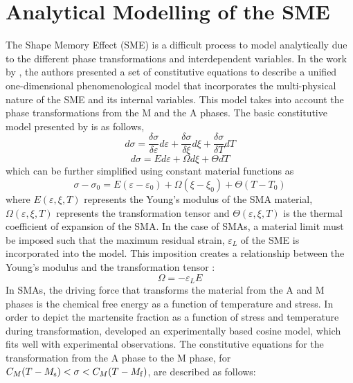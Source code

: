 \section{Analytical Modelling of the SME}

The Shape Memory Effect (SME) is a difficult process to model analytically due to the different phase transformations and interdependent variables. In the work by \cite{liangConstitutiveModelingShape1990a}, the authors presented a set of constitutive equations to describe a unified one-dimensional phenomenological model that incorporates the multi-physical nature of the SME and its internal variables. This model takes into account the phase transformations from the M and the A phases. The basic constitutive model presented by \cite{liangConstitutiveModelingShape1990a} is as follows,
\begin{equation}
  \label{eq:liang_model_1}
  d\sigma = \frac{\delta\sigma}{\delta\varepsilon}d\varepsilon + \frac{\delta\sigma}{\delta\xi}d\xi + \frac{\delta\sigma}{\delta T}dT
\end{equation}
\begin{equation}
  \label{eq:liang_model_2}
  d\sigma = Ed\varepsilon + \Omega d\xi + \Theta dT
\end{equation}
 which can be further simplified using constant material functions as
\begin{equation}
  \label{eq:liang_model_3}
  \sigma-\sigma_0 = E(\varepsilon-\varepsilon_0) + \Omega(\xi-\xi_0) + \Theta(T-T_0)
\end{equation}
where $E(\varepsilon,\xi,T)$ represents the Young's modulus of the SMA material, $\Omega(\varepsilon,\xi,T)$ represents the transformation tensor and $\Theta(\varepsilon,\xi,T)$ is the thermal coefficient of expansion of the SMA. In the case of SMAs, a material limit must be imposed such that the maximum residual strain, $\varepsilon_L$ of the SME is incorporated into the model. This imposition creates a relationship between the Young's modulus and the transformation tensor :
\begin{equation}
  \label{eq:tensor-youngsmodulus}
  \Omega = -\varepsilon_L E
\end{equation}
In SMAs, the driving force that transforms the material from the A and M phases is the chemical free energy as a function of temperature and stress. In order to depict the martensite fraction as a function of stress and temperature during transformation, \cite{liangConstitutiveModelingShape1990a} developed an experimentally based cosine model, which fits well with experimental observations. The constitutive equations for the transformation from the A phase to the M phase, for $C_M(T-M_\mathrm{s})<\sigma<C_M(T-M_\mathrm{f})$, are described as follows:

